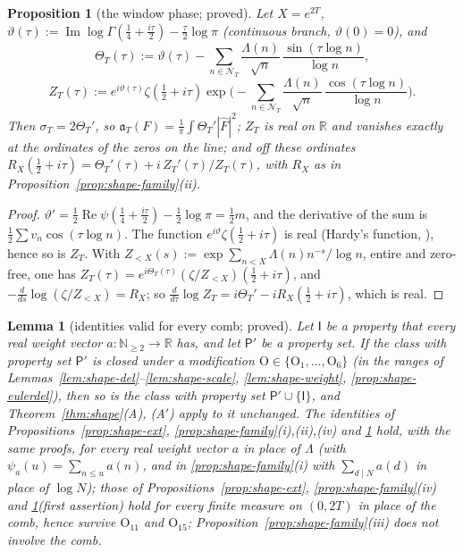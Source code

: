 \documentclass[11pt]{amsart}
\newtheorem{proposition}[theorem]{Proposition}
\newtheorem{lemma}[theorem]{Lemma}
\theoremstyle{definition}
\theoremstyle{remark}
\newcommand{\R}{\mathbb R}
\newcommand{\N}{\mathbb N}
\newcommand{\Rel}{\operatorname{Re}}
\newcommand{\Iml}{\operatorname{Im}}
\newcommand{\sT}{\sigma_T}
\newcommand{\Fh}{\widehat F}
\newcommand{\NT}{\mathcal N_T}
\begin{document}
\begin{proposition}[the window phase; proved]\label{prop:shape-phase}
Let $X=e^{2T}$, $\vartheta(\tau):=\Iml\log\Gamma(\frac14+\frac{i\tau}2)-\frac\tau2\log\pi$ (continuous branch, $\vartheta(0)=0$), and
\[
\Theta_T(\tau):=\vartheta(\tau)-\sum_{n\in\NT}\frac{\Lambda(n)}{\sqrt n}\,\frac{\sin(\tau\log n)}{\log n},
\]
\[
Z_T(\tau):=e^{i\vartheta(\tau)}\zeta(\tfrac12+i\tau)\exp\Big(-\sum_{n\in\NT}\frac{\Lambda(n)}{\sqrt n}\,\frac{\cos(\tau\log n)}{\log n}\Big).
\]
Then $\sT=2\Theta_T'$, so $\mathfrak a_T(F)=\frac1\pi\int\Theta_T'|\Fh|^2$; $Z_T$ is real on $\R$ and vanishes exactly at the ordinates of the zeros on
the line; and off these ordinates $R_X(\frac12+i\tau)=\Theta_T'(\tau)+i\,Z_T'(\tau)/Z_T(\tau)$, with $R_X$ as in
Proposition~\ref{prop:shape-family}(ii).
\end{proposition}

\begin{proof}
$\vartheta'=\frac12\Rel\psi(\frac14+\frac{i\tau}2)-\frac12\log\pi=\frac12m$, and the derivative of the sum is $\frac12\sum v_n\cos(\tau\log n)$. The
function $e^{i\vartheta}\zeta(\frac12+i\tau)$ is real (Hardy's function, \cite[\S4.17]{Titchmarsh1986}), hence so is $Z_T$. With
$Z_{<X}(s):=\exp\sum_{n<X}\Lambda(n)n^{-s}/\log n$, entire and zero-free, one has $Z_T(\tau)=e^{i\Theta_T(\tau)}(\zeta/Z_{<X})(\frac12+i\tau)$, and
$-\frac{d}{ds}\log(\zeta/Z_{<X})=R_X$; so $\frac{d}{d\tau}\log Z_T=i\Theta_T'-iR_X(\frac12+i\tau)$, which is real.
\end{proof}

\begin{lemma}[identities valid for every comb; proved]\label{lem:shape-ident}
Let $\mathsf I$ be a property that every real weight vector $a:\N_{\ge2}\to\R$ has, and let $\mathsf P'$ be a property set. If the class with property set $\mathsf P'$
is closed under a modification $\mathrm O\in\{\mathrm O_1,\dots,\mathrm O_6\}$ (in the ranges of Lemmas~\ref{lem:shape-del}--\ref{lem:shape-scale},
\ref{lem:shape-weight}, \ref{prop:shape-eulerdel}), then so is the class with property set $\mathsf P'\cup\{\mathsf I\}$, and
Theorem~\ref{thm:shape}(A), (A$'$) apply to it unchanged. The identities of Propositions~\ref{prop:shape-ext}, \ref{prop:shape-family}(i),(ii),(iv)
and \ref{prop:shape-phase} hold, with the same proofs, for every real weight vector $a$ in place of $\Lambda$ (with $\psi_a(u)=\sum_{n\le u}a(n)$, and in
\ref{prop:shape-family}(i) with $\sum_{d\mid N}a(d)$ in place of $\log N$); those of Propositions~\ref{prop:shape-ext}, \ref{prop:shape-family}(iv)
and \ref{prop:shape-phase}(first assertion) hold for every finite measure on $(0,2T)$ in place of the comb, hence survive $\mathrm O_{11}$ and
$\mathrm O_{15}$; Proposition~\ref{prop:shape-family}(iii) does not involve the comb.
\end{lemma}
\end{document}
